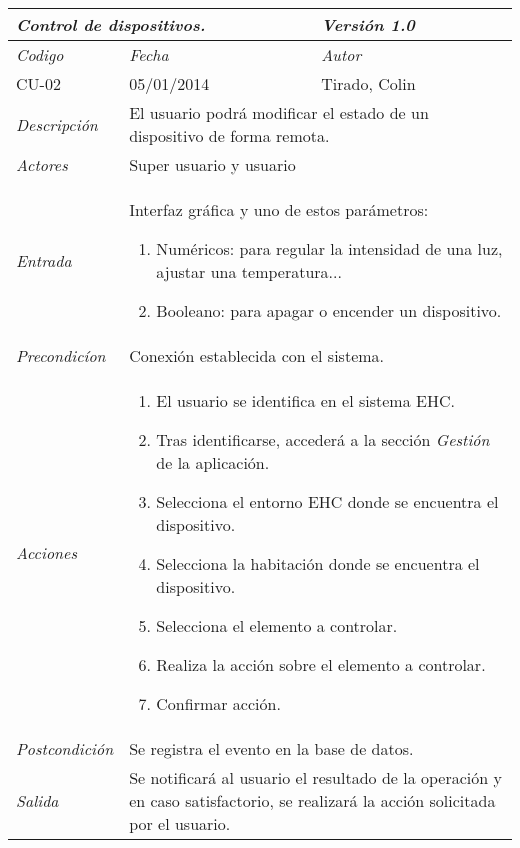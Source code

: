 
\begin{center}
    \begin{tabular}{|p{3cm}|p{4cm}|p{4cm}|p{4cm}|}
    \hline \multicolumn{3}{|p{9cm}|}{\textit{Control de dispositivos.}} & \textit{Versi\'on 1.0} \\
	\hline \textit{Codigo} & \textit{Fecha} & \multicolumn{2}{|p{6cm}|}{\textit{Autor}} \\
	CU-02 & 05/01/2014 & \multicolumn{2}{|p{6cm}|}{Tirado, Colin} \\		
    \hline \textit{Descripci\'on} & \multicolumn{3}{|p{9cm}|}{El usuario podr\'a modificar el estado de un dispositivo de forma remota.} \\
    \hline \textit{Actores} & \multicolumn{3}{|p{9cm}|}{Super usuario y usuario} \\
    \hline \textit{Entrada} & \multicolumn{3}{|p{9cm}|}{Interfaz gr\'afica y uno de estos par\'ametros:
    \begin{enumerate}
    \item Num\'ericos: para regular la intensidad de una luz, ajustar una temperatura...
    \item Booleano: para apagar o encender un dispositivo.
    \end{enumerate}} \\
    \hline \textit{Precondic\'ion} & \multicolumn{3}{|p{9cm}|}{Conexi\'on establecida con el sistema.} \\
    \hline \textit{Acciones} & \multicolumn{3}{|p{9cm}|}{
    \begin{enumerate}
    \item El usuario se identifica en el sistema EHC.
    \item Tras identificarse, acceder\'a a la secci\'on \textit{Gesti\'on} de la aplicaci\'on.
    \item Selecciona el entorno EHC donde se encuentra el dispositivo.
    \item Selecciona la habitaci\'on donde se encuentra el dispositivo.
    \item Selecciona el elemento a controlar.
    \item Realiza la acci\'on sobre el elemento a controlar.
    \item Confirmar acci\'on.
    \end{enumerate}
       } \\
    \hline \textit{Postcondici\'on} & \multicolumn{3}{|p{9cm}|}{Se registra el evento en la base de datos.} \\
    \hline \textit{Salida} & \multicolumn{3}{|p{9cm}|}{Se notificar\'a al usuario el resultado de la operaci\'on y en caso satisfactorio, se realizar\'a la acci\'on solicitada por el usuario.} \\ \hline
    \end{tabular}
\end{center}